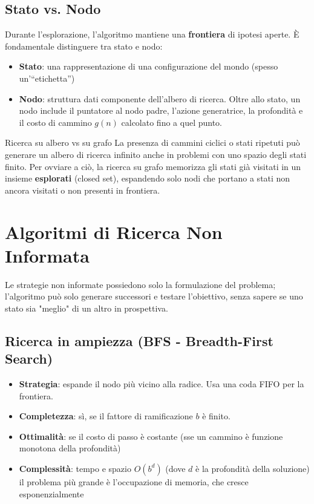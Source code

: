 \documentclass[a4paper,11pt]{report}
\begin{document}
\subsection{Stato vs. Nodo}
Durante l'esplorazione, l'algoritmo mantiene una \textbf{frontiera} di ipotesi aperte. È fondamentale distinguere tra stato e nodo:
\begin{itemize}
    \item \textbf{Stato}: una rappresentazione di una configurazione del mondo (spesso un'``etichetta'')
    \item \textbf{Nodo}: struttura dati componente dell'albero di ricerca. Oltre allo stato, un nodo include il puntatore al nodo padre, l'azione generatrice, la profondità e il costo di cammino $g(n)$ calcolato fino a quel punto.
\end{itemize}

\begin{gframe}{Ricerca su albero vs su grafo}
La presenza di cammini ciclici o stati ripetuti può generare un albero di ricerca infinito anche in problemi con uno spazio degli stati finito. Per ovviare a ciò, la ricerca su grafo memorizza gli stati già visitati in un insieme \textbf{esplorati} (closed set), espandendo solo nodi che portano a stati non ancora visitati o non presenti in frontiera.
\end{gframe}

\section{Algoritmi di Ricerca Non Informata}
Le strategie non informate possiedono solo la formulazione del problema; l'algoritmo può solo generare successori e testare l'obiettivo, senza sapere se uno stato sia "meglio" di un altro in prospettiva.

\subsection{Ricerca in ampiezza (BFS - Breadth-First Search)}
\begin{itemize}
    \item \textbf{Strategia}: espande il nodo più vicino alla radice. Usa una coda FIFO per la frontiera.
    \item \textbf{Completezza}: sì, se il fattore di ramificazione $b$ è finito.
    \item \textbf{Ottimalità}: se il costo di passo è costante (sse un cammino è funzione monotona della profondità)
    \item \textbf{Complessità}: tempo e spazio $O(b^d)$ (dove $d$ è la profondità della soluzione)
        \subitem il problema più grande è l'occupazione di memoria, che cresce esponenzialmente
\end{itemize}
\end{document}
